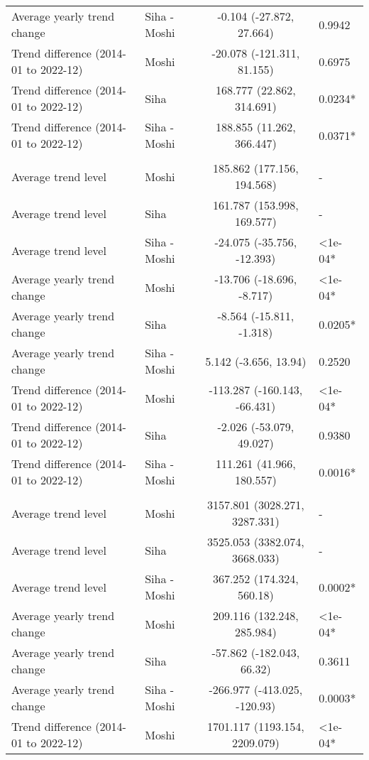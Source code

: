 \begin{longtable}{l|lcl}
Average yearly trend change & Siha - Moshi & -0.104 (-27.872, 27.664) & 0.9942 \\ 
Trend difference (2014-01 to 2022-12) & Moshi & -20.078 (-121.311, 81.155) & 0.6975 \\ 
Trend difference (2014-01 to 2022-12) & Siha & 168.777 (22.862, 314.691) & 0.0234* \\ 
Trend difference (2014-01 to 2022-12) & Siha - Moshi & 188.855 (11.262, 366.447) & 0.0371* \\ 
\midrule\addlinespace[2.5pt]
\multicolumn{4}{l}{Respiratory Diseases} \\ 
\midrule\addlinespace[2.5pt]
Average trend level & Moshi & 185.862 (177.156, 194.568) & - \\ 
Average trend level & Siha & 161.787 (153.998, 169.577) & - \\ 
Average trend level & Siha - Moshi & -24.075 (-35.756, -12.393) & <1e-04* \\ 
Average yearly trend change & Moshi & -13.706 (-18.696, -8.717) & <1e-04* \\ 
Average yearly trend change & Siha & -8.564 (-15.811, -1.318) & 0.0205* \\ 
Average yearly trend change & Siha - Moshi & 5.142 (-3.656, 13.94) & 0.2520 \\ 
Trend difference (2014-01 to 2022-12) & Moshi & -113.287 (-160.143, -66.431) & <1e-04* \\ 
Trend difference (2014-01 to 2022-12) & Siha & -2.026 (-53.079, 49.027) & 0.9380 \\ 
Trend difference (2014-01 to 2022-12) & Siha - Moshi & 111.261 (41.966, 180.557) & 0.0016* \\ 
\midrule\addlinespace[2.5pt]
\multicolumn{4}{l}{Respiratory Infections} \\ 
\midrule\addlinespace[2.5pt]
Average trend level & Moshi & 3157.801 (3028.271, 3287.331) & - \\ 
Average trend level & Siha & 3525.053 (3382.074, 3668.033) & - \\ 
Average trend level & Siha - Moshi & 367.252 (174.324, 560.18) & 0.0002* \\ 
Average yearly trend change & Moshi & 209.116 (132.248, 285.984) & <1e-04* \\ 
Average yearly trend change & Siha & -57.862 (-182.043, 66.32) & 0.3611 \\ 
Average yearly trend change & Siha - Moshi & -266.977 (-413.025, -120.93) & 0.0003* \\ 
Trend difference (2014-01 to 2022-12) & Moshi & 1701.117 (1193.154, 2209.079) & <1e-04* \\ 

\end{longtable}
